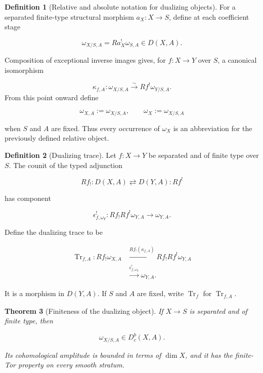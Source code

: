 \documentclass[10pt]{article}
\newtheorem{theorem}{Theorem}[section]
\theoremstyle{definition}
\newtheorem{definition}[theorem]{Definition}
\newcommand{\Dbc}{D^b_c}
\newcommand{\Tr}{\operatorname{Tr}}
\begin{document}
\begin{definition}[Relative and absolute notation for dualizing objects]
For a separated finite-type structural morphism \(a_X:X\to S\), define at
each coefficient stage

\[
 \omega_{X/S,A}=Ra_X^!\omega_{S,A}\in D(X,A).
\]

Composition of exceptional inverse images gives, for
\(f:X\to Y\) over \(S\), a canonical isomorphism

\[
 \kappa_{f,A}:\omega_{X/S,A}\xrightarrow{\sim}Rf^!\omega_{Y/S,A}.
\]
From this point onward define

\[
 \omega_{X,A}:=\omega_{X/S,A},\qquad \omega_X:=\omega_{X/S,A}
\]

when \(S\) and \(A\) are fixed.  Thus every occurrence of \(\omega_X\) is
an abbreviation for the previously defined relative object.
\end{definition}

\begin{definition}[Dualizing trace]
Let \(f:X\to Y\) be separated and of finite type over \(S\).  The counit of
the typed adjunction

\[
 Rf_!:D(X,A)\rightleftarrows D(Y,A):Rf^!
\]

has component

\[
 \epsilon^!_{f,\omega_Y}:Rf_!Rf^!\omega_{Y,A}\longrightarrow\omega_{Y,A}.
\]

Define the dualizing trace to be

\[
\begin{aligned}
 \Tr_{f,A}:Rf_!\omega_{X,A}
 &\xrightarrow{Rf_!(\kappa_{f,A})}
 Rf_!Rf^!\omega_{Y,A}\\
 &\xrightarrow{\epsilon^!_{f,\omega_Y}}\omega_{Y,A}.
\end{aligned}
\]

It is a morphism in \(D(Y,A)\).  If \(S\) and \(A\) are fixed, write
\(\Tr_f\) for \(\Tr_{f,A}\).
\end{definition}

\begin{theorem}[Finiteness of the dualizing object]
If \(X\to S\) is separated and of finite type, then

\[
 \omega_{X/S,A}\in\Dbc(X,A).
\]

Its cohomological amplitude is bounded in terms of \(\dim X\), and it has the
finite-Tor property on every smooth stratum.
\end{theorem}
\end{document}
